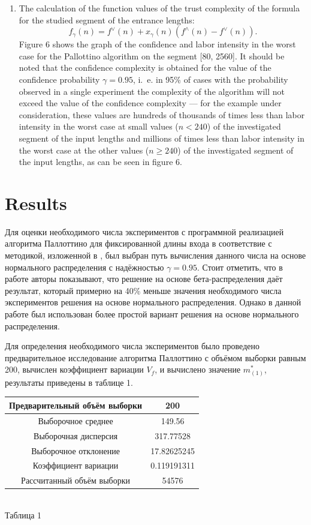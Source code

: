 \documentclass[a4paper]{article}
\begin{document}
\begin{enumerate}
	\item The calculation of the function values of the trust complexity of the formula for the studied segment of the entrance lengths: $$f_\gamma(n) = f^\vee(n) + x_\gamma(n) (f^\wedge(n) - f^\vee(n)).$$ Figure 6 shows the graph of the confidence and labor intensity in the worst case for the Pallottino algorithm on the segment [80, 2560]. It should be noted that the confidence complexity is obtained for the value of the confidence probability $\gamma = 0.95$, i.~e. in 95\% of cases with the probability observed in a single experiment  the complexity of the algorithm will not exceed the value of the confidence complexity --- for the example under consideration, these values are hundreds of thousands of times less than labor intensity in the worst case at small values ($n < 240$) of the investigated segment of the input lengths and millions of times less than labor intensity in the worst case at the other values ($n \geq 240$) of the investigated segment of the input lengths, as can be seen in figure 6.
\end{enumerate}

\section{Results} \label{sec:results}

Для оценки необходимого числа экспериментов с программной реализацией алгоритма Паллоттино для фиксированной длины входа в соответствие с методикой, изложенной в \cite{petrushyn_ulyanov_planning}, был выбран путь вычисления данного числа на основе нормального распределения с надёжностью $\gamma = 0.95$. Стоит отметить, что в работе \cite{petrushyn_ulyanov_planning} авторы показывают, что решение на основе бета-распределения даёт результат, который примерно на 40\% меньше значения необходимого числа экспериментов решения на основе нормального распределения. Однако в данной работе был использован более простой вариант решения на основе нормального распределения.

Для определения необходимого числа экспериментов было проведено предварительное исследование алгоритма Паллоттино с объёмом выборки равным 200, вычислен коэффициент вариации $V_f$, и вычислено значение $m_{(1)}^*$, результаты приведены в таблице 1.

\begin{center}
	\label{table1}
\begin{tabular}{|c|c|}
	\hline
	Предварительный объём выборки & 200 \\
	\hline
	Выборочное среднее & 149.56 \\
	\hline
	Выборочная дисперсия & 317.77528 \\
	\hline
	Выборочное отклонение & 17.82625245 \\
	\hline
	Коэффициент вариации & 0.119191311 \\
	\hline
	Рассчитанный объём выборки & 54576 \\
	\hline
\end{tabular} \\
	\hfill \break
	Таблица 1
\end{center}
\end{document}
